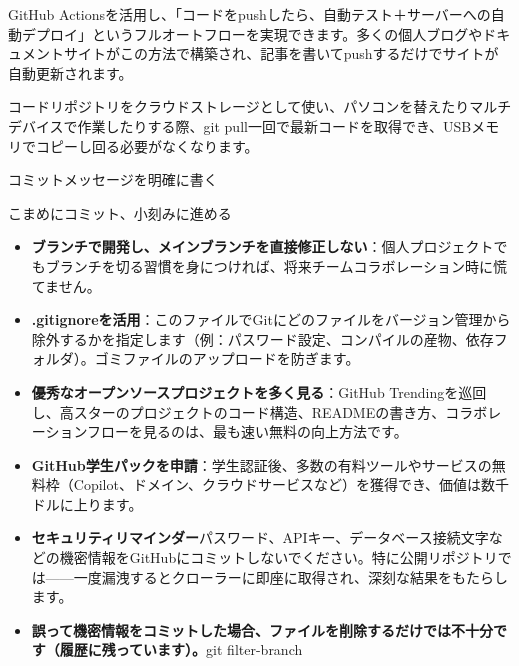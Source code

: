 
GitHub Actionsを活用し、「コードをpushしたら、自動テスト＋サーバーへの自動デプロイ」というフルオートフローを実現できます。多くの個人ブログやドキュメントサイトがこの方法で構築され、記事を書いてpushするだけでサイトが自動更新されます。


コードリポジトリをクラウドストレージとして使い、パソコンを替えたりマルチデバイスで作業したりする際、git pull一回で最新コードを取得でき、USBメモリでコピーし回る必要がなくなります。


コミットメッセージを明確に書く


こまめにコミット、小刻みに進める


\begin{itemize}
  \item \textbf{ブランチで開発し、メインブランチを直接修正しない}：個人プロジェクトでもブランチを切る習慣を身につければ、将来チームコラボレーション時に慌てません。
  \item \textbf{.gitignoreを活用}：このファイルでGitにどのファイルをバージョン管理から除外するかを指定します（例：パスワード設定、コンパイルの産物、依存フォルダ）。ゴミファイルのアップロードを防ぎます。
  \item \textbf{優秀なオープンソースプロジェクトを多く見る}：GitHub Trendingを巡回し、高スターのプロジェクトのコード構造、READMEの書き方、コラボレーションフローを見るのは、最も速い無料の向上方法です。
  \item \textbf{GitHub学生パックを申請}：学生認証後、多数の有料ツールやサービスの無料枠（Copilot、ドメイン、クラウドサービスなど）を獲得でき、価値は数千ドルに上ります。
  \item \textbf{セキュリティリマインダー}パスワード、APIキー、データベース接続文字などの機密情報をGitHubにコミットしないでください。特に公開リポジトリでは——一度漏洩するとクローラーに即座に取得され、深刻な結果をもたらします。
  \item \textbf{誤って機密情報をコミットした場合、ファイルを削除するだけでは不十分です（履歴に残っています）。}git filter-branch
\end{itemize}

